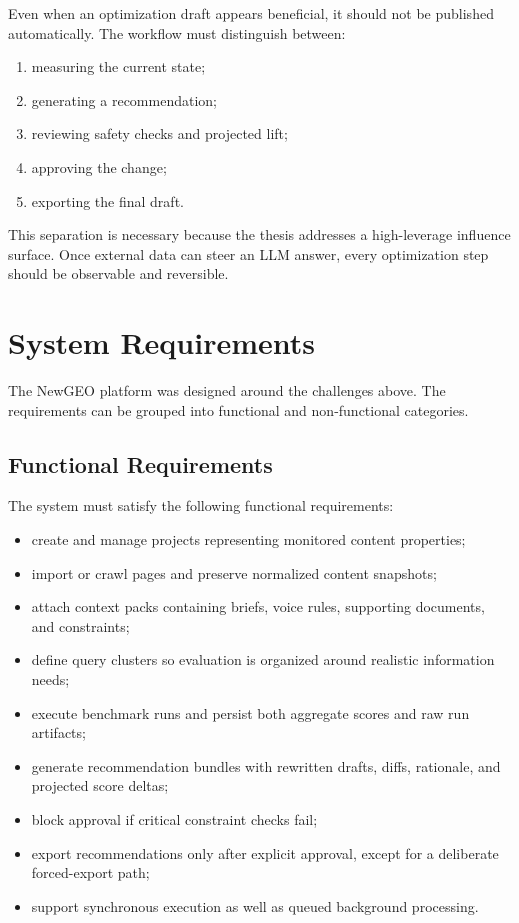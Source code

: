 Even when an optimization draft appears beneficial, it should not be published automatically.
The workflow must distinguish between:
\begin{enumerate}
    \item measuring the current state;
    \item generating a recommendation;
    \item reviewing safety checks and projected lift;
    \item approving the change;
    \item exporting the final draft.
\end{enumerate}

This separation is necessary because the thesis addresses a high-leverage influence surface.
Once external data can steer an LLM answer, every optimization step should be observable and
reversible.

\section{System Requirements}

The NewGEO platform was designed around the challenges above. The requirements can be
grouped into functional and non-functional categories.

\subsection{Functional Requirements}

The system must satisfy the following functional requirements:
\begin{itemize}
    \item create and manage projects representing monitored content properties;
    \item import or crawl pages and preserve normalized content snapshots;
    \item attach context packs containing briefs, voice rules, supporting documents, and constraints;
    \item define query clusters so evaluation is organized around realistic information needs;
    \item execute benchmark runs and persist both aggregate scores and raw run artifacts;
    \item generate recommendation bundles with rewritten drafts, diffs, rationale, and projected score deltas;
    \item block approval if critical constraint checks fail;
    \item export recommendations only after explicit approval, except for a deliberate forced-export path;
    \item support synchronous execution as well as queued background processing.
\end{itemize}

